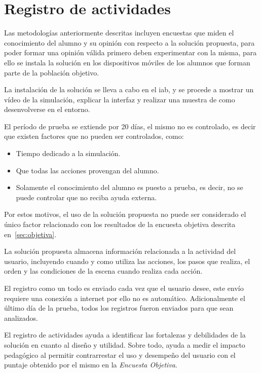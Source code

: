 \section{Registro de actividades}
\label{sec:registro}

Las metodologías anteriormente descritas incluyen encuestas que miden
el conocimiento del alumno y su opinión con respecto a la solución propuesta,
para poder formar una opinión válida primero deben experimentar con la misma, para
ello se instala la solución en los dispositivos móviles de los alumnos que forman 
parte de la población objetivo.

La instalación de la solución se lleva a cabo en el \Gls{iab}, y se procede 
a mostrar un vídeo de la simulación, explicar la interfaz y realizar una muestra 
de como desenvolverse en el entorno.

El período de prueba se extiende por 20 días, el mismo no es controlado, es
decir que existen factores que no pueden ser controlados, como:

\begin{itemize}
    \item Tiempo dedicado a la simulación.
    \item Que todas las acciones provengan del alumno.
    \item Solamente el conocimiento del alumno es puesto a prueba, es decir, no
        se puede controlar que no reciba ayuda externa.
\end{itemize}

Por estos motivos, el uso de la solución propuesta no puede ser considerado
el único factor relacionado con los resultados de la encuesta objetiva
descrita en~\ref{sec:objetiva}.

La solución propuesta almacena información relacionada a la actividad del
usuario, incluyendo cuando y como utiliza las acciones, los pasos que realiza,
el orden y las condiciones de la escena cuando realiza cada acción.

El registro como un todo es enviado cada vez que el usuario desee, este envío
requiere una conexión a internet por ello no es automático. Adicionalmente el
último día de la prueba, todos los registros fueron enviados para que sean
analizados.

El registro de actividades ayuda a identificar las  fortalezas y debilidades 
de la solución en cuanto al diseño y utilidad. Sobre todo, ayuda a medir 
el impacto pedagógico al permitir contrarrestar el uso y desempeño del usuario 
con el puntaje obtenido por el mismo en la \emph{Encuesta Objetiva}.

